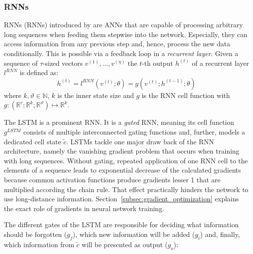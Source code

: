 \subsubsection{\acl{RNN}s}
\acl{RNN}s (\acs{RNN}s) introduced by \textcite{hopfield_neural_1982} are \ac{ANN}s that are capable of processing arbitrary long sequences when feeding them stepwise into the network. Especially, they can access information from any previous step and, hence, process the new data conditionally. This is possible via a feedback loop in a \textit{recurrent layer}. Given a sequence of $\tau$-sized vectors $v^{(1)}, ..., v^{(\eta)}$ the $t$-th output $h^{(t)}$ of a recurrent layer $l^{RNN}$ is defined as:
\begin{equation} \label{eq:rnn}
h^{(t)} = l^{RNN}(v^{(t)};\theta) = g(v^{(t)}; h^{(t-1)};\theta)
\end{equation}
where $k, \vartheta \in \mathbb{N}$, $k$ is the inner state size and $g$ is the \ac{RNN} cell function with $g:(\mathbb{R}^\tau; \mathbb{R}^k; \mathbb{R}^\vartheta) \mapsto \mathbb{R}^k$.

The \acf{LSTM} \autocite{hochreiter_long_1997} is a prominent \ac{RNN}. It is a \textit{gated} \ac{RNN}, meaning its cell function $g^{LSTM}$ consists of multiple interconnected gating functions and, further, models a dedicated cell state $\tilde{c}$. \ac{LSTM}s tackle one major draw back of the \ac{RNN} architecture, namely the vanishing gradient problem that occurs when training with long sequences. Without gating, repeated application of one \ac{RNN} cell to the elements of a sequence leads to exponential decrease of the calculated gradients because common activation functions produce gradients lesser 1 that are multiplied according the chain rule. That effect practically hinders the network to use long-distance information. Section~\ref{subsec:gradient_optimization} explains the exact role of gradients in neural network training.

The different gates of the \ac{LSTM} are responsible for deciding what information should be forgotten ($g_f$), which new information will be added ($g_i$) and, finally, which information from $\tilde{c}$ will be presented as output ($g_o$):

